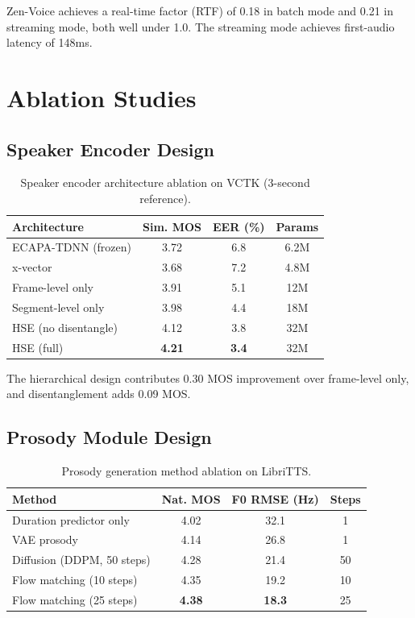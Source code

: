 \documentclass[11pt,a4paper]{article}
\begin{document}
Zen-Voice achieves a real-time factor (RTF) of 0.18 in batch mode and 0.21 in streaming mode, both well under 1.0. The streaming mode achieves first-audio latency of 148ms.

\section{Ablation Studies}
\label{sec:ablation}

\subsection{Speaker Encoder Design}

\begin{table}[t]
\centering
\caption{Speaker encoder architecture ablation on VCTK (3-second reference).}
\label{tab:spk_ablation}
\begin{tabular}{lccc}
\toprule
\textbf{Architecture} & \textbf{Sim. MOS} & \textbf{EER (\%)} & \textbf{Params} \\
\midrule
ECAPA-TDNN (frozen) & 3.72 & 6.8 & 6.2M \\
x-vector & 3.68 & 7.2 & 4.8M \\
Frame-level only & 3.91 & 5.1 & 12M \\
Segment-level only & 3.98 & 4.4 & 18M \\
HSE (no disentangle) & 4.12 & 3.8 & 32M \\
HSE (full) & \textbf{4.21} & \textbf{3.4} & 32M \\
\bottomrule
\end{tabular}
\end{table}

The hierarchical design contributes 0.30 MOS improvement over frame-level only, and disentanglement adds 0.09 MOS.

\subsection{Prosody Module Design}

\begin{table}[t]
\centering
\caption{Prosody generation method ablation on LibriTTS.}
\label{tab:prosody_ablation}
\begin{tabular}{lccc}
\toprule
\textbf{Method} & \textbf{Nat. MOS} & \textbf{F0 RMSE (Hz)} & \textbf{Steps} \\
\midrule
Duration predictor only & 4.02 & 32.1 & 1 \\
VAE prosody & 4.14 & 26.8 & 1 \\
Diffusion (DDPM, 50 steps) & 4.28 & 21.4 & 50 \\
Flow matching (10 steps) & 4.35 & 19.2 & 10 \\
Flow matching (25 steps) & \textbf{4.38} & \textbf{18.3} & 25 \\
\bottomrule
\end{tabular}
\end{table}
\end{document}
